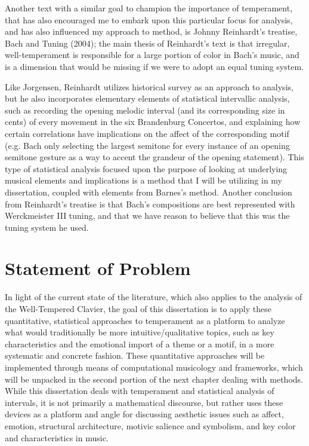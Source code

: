 Another text with a similar goal to champion the importance of
temperament, that has also encouraged me to embark upon this particular
focus for analysis, and has also influenced my approach to method, is
Johnny Reinhardt's treatise, Bach and Tuning (2004); the main thesis of
Reinhardt's text is that irregular, well-temperament is responsible for
a large portion of color in Bach's music, and is a dimension that would
be missing if we were to adopt an equal tuning system.

Like Jorgensen, Reinhardt utilizes historical survey as an approach to
analysis, but he also incorporates elementary elements of statistical
intervallic analysis, such as recording the opening melodic interval
(and its corresponding size in cents) of every movement in the six
Brandenburg Concertos, and explaining how certain correlations have
implications on the affect of the corresponding motif (e.g. Bach only
selecting the largest semitone for every instance of an opening semitone
gesture as a way to accent the grandeur of the opening statement). This
type of statistical analysis focused upon the purpose of looking at
underlying musical elements and implications is a method that I will be
utilizing in my dissertation, coupled with elements from Barnes's
method. Another conclusion from Reinhardt's treatise is that Bach's
compositions are best represented with Werckmeister III tuning, and that
we have reason to believe that this was the tuning system he used.

    \section{Statement of Problem}\label{statement-of-problem}

In light of the current state of the literature, which also applies to
the analysis of the Well-Tempered Clavier, the goal of this dissertation
is to apply these quantitative, statistical approaches to temperament as
a platform to analyze what would traditionally be more
intuitive/qualitative topics, such as key characteristics and the
emotional import of a theme or a motif, in a more systematic and
concrete fashion. These quantitative approaches will be implemented
through means of computational musicology and frameworks, which will be
unpacked in the second portion of the next chapter dealing with methods.
While this dissertation deals with temperament and statistical analysis
of intervals, it is not primarily a mathematical discourse, but rather
uses these devices as a platform and angle for discussing aesthetic
issues such as affect, emotion, structural architecture, motivic
salience and symbolism, and key color and characteristics in music.

